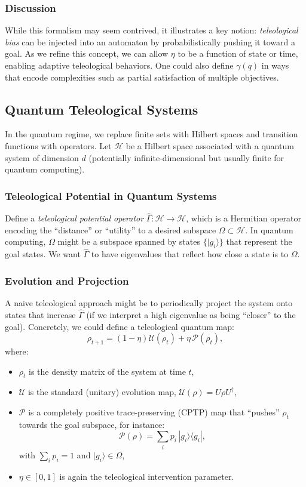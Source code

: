 \documentclass[12pt]{article}
\begin{document}
\subsubsection{Discussion}

While this formalism may seem contrived, it illustrates a key notion: \emph{teleological bias} can be injected into an automaton by probabilistically pushing it toward a goal. As we refine this concept, we can allow $\eta$ to be a function of state or time, enabling adaptive teleological behaviors. One could also define $\gamma(q)$ in ways that encode complexities such as partial satisfaction of multiple objectives.

\subsection{Quantum Teleological Systems}

In the quantum regime, we replace finite sets with Hilbert spaces and transition functions with operators. Let $\mathcal{H}$ be a Hilbert space associated with a quantum system of dimension $d$ (potentially infinite-dimensional but usually finite for quantum computing). 

\subsubsection{Teleological Potential in Quantum Systems}

Define a \emph{teleological potential operator} $\hat{\Gamma}: \mathcal{H} \to \mathcal{H}$, which is a Hermitian operator encoding the ``distance'' or ``utility'' to a desired subspace $\Omega \subset \mathcal{H}$. In quantum computing, $\Omega$ might be a subspace spanned by states $\{|g_i\rangle\}$ that represent the goal states. We want $\hat{\Gamma}$ to have eigenvalues that reflect how close a state is to $\Omega$.

\subsubsection{Evolution and Projection}

A naive teleological approach might be to periodically project the system onto states that increase $\hat{\Gamma}$ (if we interpret a high eigenvalue as being ``closer'' to the goal). Concretely, we could define a teleological quantum map:
\[
\rho_{t+1} = (1-\eta)\mathcal{U}(\rho_t) + \eta \,\mathcal{P}(\rho_t),
\]
where:
\begin{itemize}
    \item $\rho_t$ is the density matrix of the system at time $t$,
    \item $\mathcal{U}$ is the standard (unitary) evolution map, $\mathcal{U}(\rho) = U \rho U^\dagger$,
    \item $\mathcal{P}$ is a completely positive trace-preserving (CPTP) map that ``pushes'' $\rho_t$ towards the goal subspace, for instance:
    \[
    \mathcal{P}(\rho) = \sum_i p_i \, |g_i\rangle \langle g_i|,
    \]
    with $\sum_i p_i = 1$ and $|g_i\rangle \in \Omega$,
    \item $\eta \in [0,1]$ is again the teleological intervention parameter.
\end{itemize}
\end{document}
